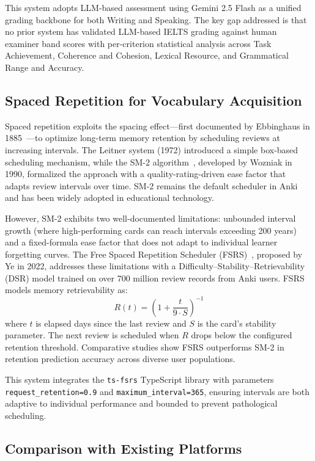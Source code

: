\documentclass[conference]{IEEEtran}
\begin{document}
This system adopts LLM-based assessment using Gemini 2.5 Flash as a unified grading backbone for both Writing and Speaking. The key gap addressed is that no prior system has validated LLM-based IELTS grading against human examiner band scores with per-criterion statistical analysis across Task Achievement, Coherence and Cohesion, Lexical Resource, and Grammatical Range and Accuracy.

\subsection{Spaced Repetition for Vocabulary Acquisition}

Spaced repetition exploits the spacing effect---first documented by Ebbinghaus in 1885~\cite{ebbinghaus}---to optimize long-term memory retention by scheduling reviews at increasing intervals. The Leitner system (1972) introduced a simple box-based scheduling mechanism, while the SM-2 algorithm~\cite{sm2}, developed by Wozniak in 1990, formalized the approach with a quality-rating-driven ease factor that adapts review intervals over time. SM-2 remains the default scheduler in Anki and has been widely adopted in educational technology.

However, SM-2 exhibits two well-documented limitations: unbounded interval growth (where high-performing cards can reach intervals exceeding 200 years) and a fixed-formula ease factor that does not adapt to individual learner forgetting curves. The Free Spaced Repetition Scheduler (FSRS)~\cite{fsrs}, proposed by Ye in 2022, addresses these limitations with a Difficulty--Stability--Retrievability (DSR) model trained on over 700 million review records from Anki users. FSRS models memory retrievability as:
\begin{equation}
R(t) = \left(1 + \frac{t}{9 \cdot S}\right)^{-1}
\label{eq:retrievability}
\end{equation}
where $t$ is elapsed days since the last review and $S$ is the card's stability parameter. The next review is scheduled when $R$ drops below the configured retention threshold. Comparative studies show FSRS outperforms SM-2 in retention prediction accuracy across diverse user populations.

This system integrates the \texttt{ts-fsrs} TypeScript library with parameters \texttt{request\_retention=0.9} and \texttt{maximum\_interval=365}, ensuring intervals are both adaptive to individual performance and bounded to prevent pathological scheduling.

\subsection{Comparison with Existing Platforms}
\end{document}
